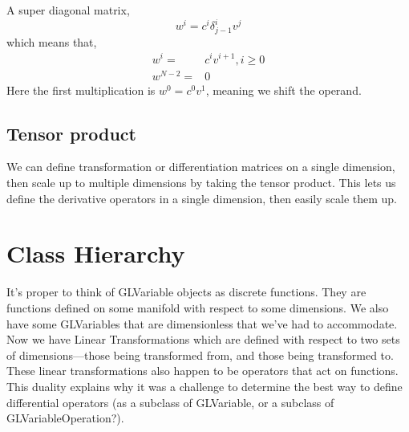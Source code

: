 \documentclass[11pt]{article}
\begin{document}
A super diagonal matrix,
\begin{equation}
w^i = c^i \delta^i_{j-1} v^j
\end{equation}
which means that,
\begin{align}
w^i = & c^i v^{i+1}, i \geqslant 0\\
w^{N-2} =& 0
\end{align}
Here the first multiplication is $w^0 = c^0 v^1$, meaning we shift the operand.

\subsection{Tensor product}

We can define transformation or differentiation matrices on a single dimension, then scale up to multiple dimensions by taking the tensor product. This lets us define the derivative operators in a single dimension, then easily scale them up.

\section{Class Hierarchy}

It's proper to think of GLVariable objects as discrete functions. They are functions defined on some manifold with respect to some dimensions. We also have some GLVariables that are dimensionless that we've had to accommodate. Now we have Linear Transformations which are defined with respect to two sets of dimensions---those being transformed from, and those being transformed to. These linear transformations also happen to be operators that act on functions. This duality explains why it was a challenge to determine the best way to define differential operators (as a subclass of GLVariable, or a subclass of GLVariableOperation?).
\end{document}
